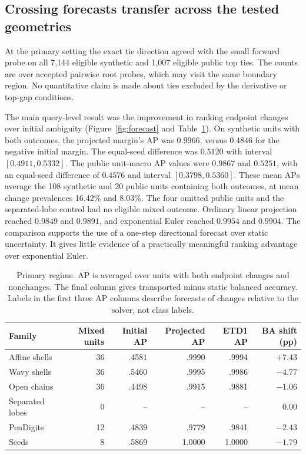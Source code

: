 \subsection{Crossing forecasts transfer across the tested geometries}
At the primary setting the exact tie direction agreed with the small forward probe on all 7,144 eligible synthetic and 1,007 eligible public top ties. The counts are over accepted pairwise root probes, which may visit the same boundary region. No quantitative claim is made about ties excluded by the derivative or top-gap conditions.

The main query-level result was the improvement in ranking endpoint changes over initial ambiguity (Figure~\ref{fig:forecast} and Table~\ref{tab:rank}). On synthetic units with both outcomes, the projected margin's AP was $0.9966$, versus $0.4846$ for the negative initial margin. The equal-seed difference was $0.5120$ with interval $[0.4911,0.5332]$. The public unit-macro AP values were $0.9867$ and $0.5251$, with an equal-seed difference of $0.4576$ and interval $[0.3798,0.5360]$. These mean APs average the 108 synthetic and 20 public units containing both outcomes, at mean change prevalences 16.42\% and 8.03\%. The four omitted public units and the separated-lobe control had no eligible mixed outcome. Ordinary linear projection reached $0.9849$ and $0.9891$, and exponential Euler reached $0.9954$ and $0.9904$. The comparison supports the use of a one-step directional forecast over static uncertainty. It gives little evidence of a practically meaningful ranking advantage over exponential Euler.

\begin{table}[htbp]
\centering
\small
\caption{Primary regime. AP is averaged over units with both endpoint changes and nonchanges. The final column gives transported minus static balanced accuracy. Labels in the first three AP columns describe forecasts of changes relative to the solver, not class labels.}
\label{tab:rank}
\begin{tabular}{lrrrrr}
\toprule
Family & Mixed units & Initial AP & Projected AP & ETD1 AP & BA shift (pp)\\
\midrule
Affine shells & 36 & .4581 & .9990 & .9994 & $+7.43$\\
Wavy shells & 36 & .5460 & .9995 & .9986 & $-4.77$\\
Open chains & 36 & .4498 & .9915 & .9881 & $-1.06$\\
Separated lobes & 0 & -- & -- & -- & $0.00$\\
PenDigits & 12 & .4839 & .9779 & .9841 & $-2.43$\\
Seeds & 8 & .5869 & 1.0000 & 1.0000 & $-1.79$\\
\bottomrule
\end{tabular}
\end{table}

